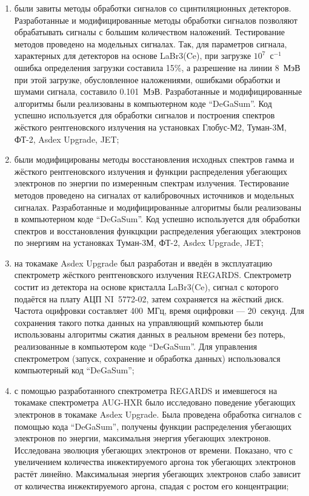 \begin{enumerate}
  \item были завиты методы обработки сигналов со сцинтиляционных детекторов. Разработанные и модифицированные методы обработки сигналов позволяют обрабатывать сигналы с большим количеством наложений. Тестирование методов проведено на модельных сигналах. Так, для параметров сигнала, характерных для детекторов на основе LaBr3(Ce), при загрузке $10^7$~с${}^{-1}$ ошибка определения загрузки составила 15\%, а разрешение на линии 8~МэВ при этой загрузке, обусловленное наложениями, ошибками обработки и шумами сигнала, составило 0.101~МэВ. Разработанные и модифицированные алгоритмы были реализованы в компьютерном коде ``DeGaSum''. Код успешно используется для обработки сигналов и построения спектров жёсткого рентгеновского излучения на установках Глобус-М2, Туман-3М, ФТ-2, Asdex Upgrade, JET;

  \item были модифицированы методы восстановления исходных спектров гамма и жёсткого рентгеновского излучения и функции распределения убегающих электронов по энергии по измеренным спектрам излучения. Тестирование методов проведено на сигналах от калибровочных источников и модельных сигналах. Разработанные и модифицированные алгоритмы были реализованы в компьютерном коде ``DeGaSum''. Код успешно используется для обработки спектров и восстановления функцкции распределения убегающих электронов по энергиям на установках Туман-3М, ФТ-2, Asdex Upgrade, JET;

  \item на токамаке Asdex Upgrade был разработан и введён в эксплуатацию спектрометр жёсткого рентгеновского излучения REGARDS. Спектрометр состит из детектора на основе кристалла LaBr3(Ce), сигнал с которого подаётся на плату АЦП NI~5772-02, затем сохраняется на жёсткий диск. Частота оцифровки составляет 400~МГц, время оцифровки --- 20~секунд. Для сохранения такого потка данных на управляющий компьютер были использованы алгоритмы сжатия данных в реальном времени без потерь, реализованные в компьютером коде ``DeGaSum''. Для управления спектрометром (запуск, сохранение и обработка данных) использовался компьютерный код ``DeGaSum'';

  \item с помощью разработанного спектрометра REGARDS и имевшегося на токамаке спектрометра AUG-HXR было исследовано поведение убегающих электронов в токамаке Asdex Upgrade. Была проведена обработка сигналов с помощью кода ``DeGaSum'', получены функции распределения убегающих электронов по энергии, максимальня энергия убегающих электронов. Исследована эволюция убегающих электронов от времени. Показано, что с увеличением количества инжектируемого аргона ток убегающих электронов растёт линейно. Максимальная энергия убегающих электронов слабо зависит от количества инжектируемого аргона, спадая с ростом его концентрации;


\end{enumerate}
